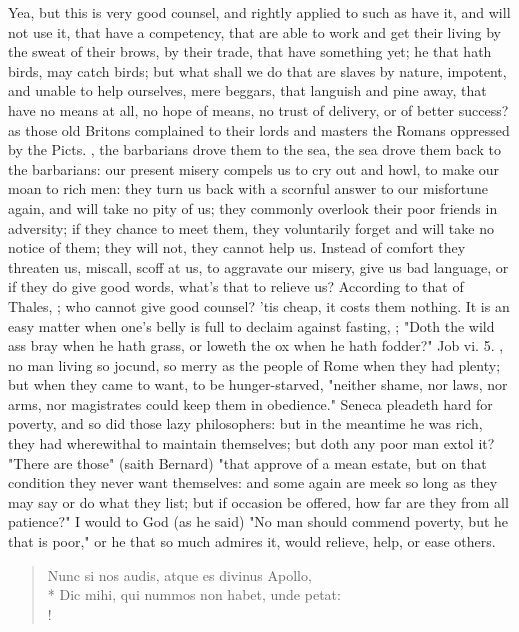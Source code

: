 {Yea, but this is very good counsel, and rightly applied to such as have it, and will not use it, that have a competency, that are able to work and get their living by the sweat of their brows, by their trade, that have something yet; he that hath birds, may catch birds; but what shall we do that are slaves by nature, impotent, and unable to help ourselves, mere beggars, that languish and pine away, that have no means at all, no hope of means, no trust of delivery, or of better success? as those old Britons complained to their lords and masters the Romans oppressed by the Picts. , the barbarians drove them to the sea, the sea drove them back to the barbarians: our present misery compels us to cry out and howl, to make our moan to rich men: they turn us back with a scornful answer to our misfortune again, and will take no pity of us; they commonly overlook their poor friends in adversity; if they chance to meet them, they voluntarily forget and will take no notice of them; they will not, they cannot help us. Instead of comfort they threaten us, miscall, scoff at us, to aggravate our misery, give us bad language, or if they do give good words, what's that to relieve us? According to that of Thales, ; who cannot give good counsel? 'tis cheap, it costs them nothing. It is an easy matter when one's belly is full to declaim against fasting, ; "Doth the wild ass bray when he hath grass, or loweth the ox when he hath fodder?" Job vi. 5. , no man living so jocund, so merry as the people of Rome when they had plenty; but when they came to want, to be hunger-starved, "neither shame, nor laws, nor arms, nor magistrates could keep them in obedience." Seneca pleadeth hard for poverty, and so did those lazy philosophers: but in the meantime he was rich, they had wherewithal to maintain themselves; but doth any poor man extol it? "There are those" (saith Bernard) "that approve of a mean estate, but on that condition they never want themselves: and some again are meek so long as they may say or do what they list; but if occasion be offered, how far are they from all patience?" I would to God (as he said) "No man should commend poverty, but he that is poor," or he that so much admires it, would relieve, help, or ease others.

\begin{latin}
\begin{verse}%
Nunc si nos audis, atque es divinus Apollo,\\*
Dic mihi, qui nummos non habet, unde petat:\\!
\end{verse}%
\end{latin}



}
